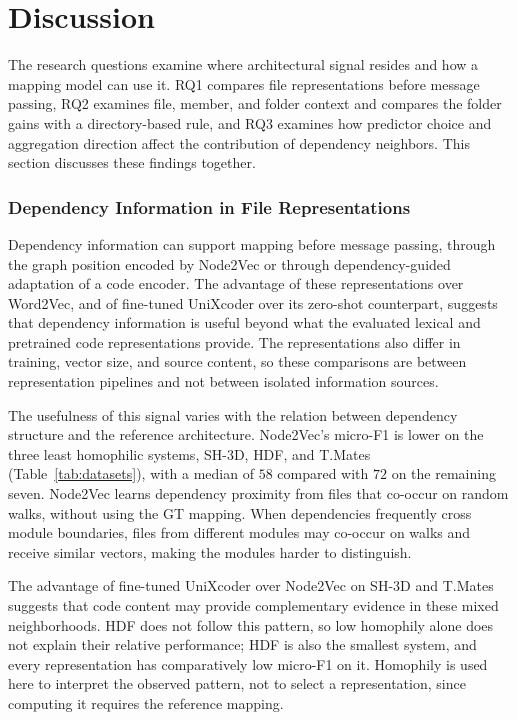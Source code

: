 \section{Discussion\label{sec:discussion}}
The research questions examine where architectural signal resides and how a mapping model can use it. RQ1 compares file representations before message passing, RQ2 examines file, member, and folder context and compares the folder gains with a directory-based rule, and RQ3 examines how predictor choice and aggregation direction affect the contribution of dependency neighbors. This section discusses these findings together.

\subsubsection*{Dependency Information in File Representations}
Dependency information can support mapping before message passing, through the graph position encoded by Node2Vec or through dependency-guided adaptation of a code encoder. The advantage of these representations over Word2Vec, and of fine-tuned UniXcoder over its zero-shot counterpart, suggests that dependency information is useful beyond what the evaluated lexical and pretrained code representations provide. The representations also differ in training, vector size, and source content, so these comparisons are between representation pipelines and not between isolated information sources.

The usefulness of this signal varies with the relation between dependency structure and the reference architecture. Node2Vec’s micro-F1 is lower on the three least homophilic systems, SH-3D, HDF, and T.Mates (Table~\ref{tab:datasets}), with a median of $58$ compared with $72$ on the remaining seven. Node2Vec learns dependency proximity from files that co-occur on random walks, without using the GT mapping. When dependencies frequently cross module boundaries, files from different modules may co-occur on walks and receive similar vectors, making the modules harder to distinguish.

The advantage of fine-tuned UniXcoder over Node2Vec on SH-3D and T.Mates suggests that code content may provide complementary evidence in these mixed neighborhoods. HDF does not follow this pattern, so low homophily alone does not explain their relative performance; HDF is also the smallest system, and every representation has comparatively low micro-F1 on it. Homophily is used here to interpret the observed pattern, not to select a representation, since computing it requires the reference mapping.

